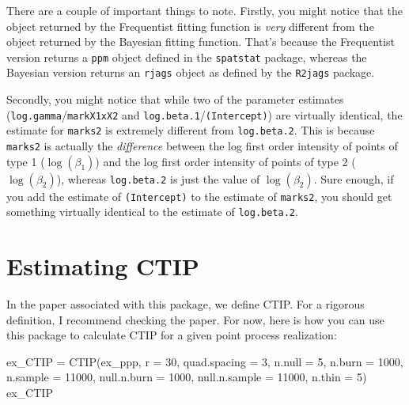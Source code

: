 \documentclass[
]{book}
\newenvironment{Shaded}{\begin{snugshade}}{\end{snugshade}}
\newcommand{\AttributeTok}[1]{\textcolor[rgb]{0.77,0.63,0.00}{#1}}
\newcommand{\DecValTok}[1]{\textcolor[rgb]{0.00,0.00,0.81}{#1}}
\newcommand{\FunctionTok}[1]{\textcolor[rgb]{0.00,0.00,0.00}{#1}}
\newcommand{\NormalTok}[1]{#1}
\newcommand{\OtherTok}[1]{\textcolor[rgb]{0.56,0.35,0.01}{#1}}
\begin{document}
There are a couple of important things to note. Firstly, you might notice that the object returned by the Frequentist fitting function is \emph{very} different from the object returned by the Bayesian fitting function. That's because the Frequentist version returns a \texttt{ppm} object defined in the \texttt{spatstat} package, whereas the Bayesian version returns an \texttt{rjags} object as defined by the \texttt{R2jags} package.

Secondly, you might notice that while two of the parameter estimates (\texttt{log.gamma}/\texttt{markX1xX2} and \texttt{log.beta.1}/\texttt{(Intercept)}) are virtually identical, the estimate for \texttt{marks2} is extremely different from \texttt{log.beta.2}. This is because \texttt{marks2} is actually the \emph{difference} between the log first order intensity of points of type 1 (\(\log(\beta_1)\)) and the log first order intensity of points of type 2 (\(\log(\beta_2)\)), whereas \texttt{log.beta.2} is just the value of \(\log(\beta_2)\). Sure enough, if you add the estimate of \texttt{(Intercept)} to the estimate of \texttt{marks2}, you should get something virtually identical to the estimate of \texttt{log.beta.2}.

\hypertarget{estimating-ctip}{%
\section{Estimating CTIP}\label{estimating-ctip}}

In the paper associated with this package, we define CTIP. For a rigorous definition, I recommend checking the paper. For now, here is how you can use this package to calculate CTIP for a given point process realization:

\begin{Shaded}
\begin{Highlighting}[]
\NormalTok{ex\_CTIP }\OtherTok{=} \FunctionTok{CTIP}\NormalTok{(ex\_ppp, }\AttributeTok{r =} \DecValTok{30}\NormalTok{, }\AttributeTok{quad.spacing =} \DecValTok{3}\NormalTok{, }
               \AttributeTok{n.null =} \DecValTok{5}\NormalTok{, }\AttributeTok{n.burn =} \DecValTok{1000}\NormalTok{,}
               \AttributeTok{n.sample =} \DecValTok{11000}\NormalTok{, }\AttributeTok{null.n.burn =} \DecValTok{1000}\NormalTok{, }\AttributeTok{null.n.sample =} \DecValTok{11000}\NormalTok{,}
               \AttributeTok{n.thin =} \DecValTok{5}\NormalTok{)}
\NormalTok{ex\_CTIP}
\end{Highlighting}
\end{Shaded}
\end{document}
